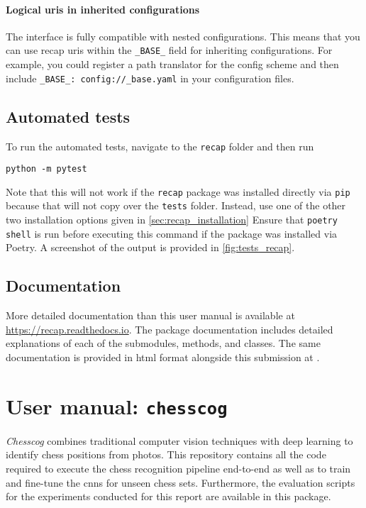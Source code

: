 \documentclass[../../report.tex]{subfiles}
\begin{document}
\subsubsection{Logical \acsp{uri} in inherited configurations}
The  interface is fully compatible with nested configurations.
This means that you can use recap \glspl{uri} within the \texttt{_BASE_} field for inheriting configurations.
For example, you could register a path translator for the config scheme and then include \texttt{_BASE_: config://_base.yaml} in your configuration files.

\section{Automated tests}
\label{sec:recap_tests}
To run the automated tests, navigate to the \texttt{recap} folder and then run
\begin{verbatim}
python -m pytest
\end{verbatim}
Note that this will not work if the \texttt{recap} package was installed directly via \texttt{pip} because that will not copy over the \texttt{tests} folder.
Instead, use one of the other two installation options given in \cref{sec:recap_installation}
Ensure that \texttt{poetry shell} is run before executing this command if the package was installed via Poetry.
A screenshot of the output is provided in \cref{fig:tests_recap}.

\section{Documentation}
\label{sec:recap_documentation}
More detailed documentation than this user manual is available at \url{https://recap.readthedocs.io}.
The package documentation includes detailed explanations of each of the submodules, methods, and classes.
The same documentation is provided in \gls{html} format alongside this submission at .

\chapter{User manual: \texttt{chesscog}}
\label{chap:user_man_chesscog}

\emph{Chesscog} combines traditional computer vision techniques with deep learning to identify chess positions from photos.
This repository contains all the code required to execute the chess recognition pipeline end-to-end as well as to train and fine-tune the \glspl{cnn} for unseen chess sets.
Furthermore, the evaluation scripts for the experiments conducted for this report are available in this package.
\end{document}
